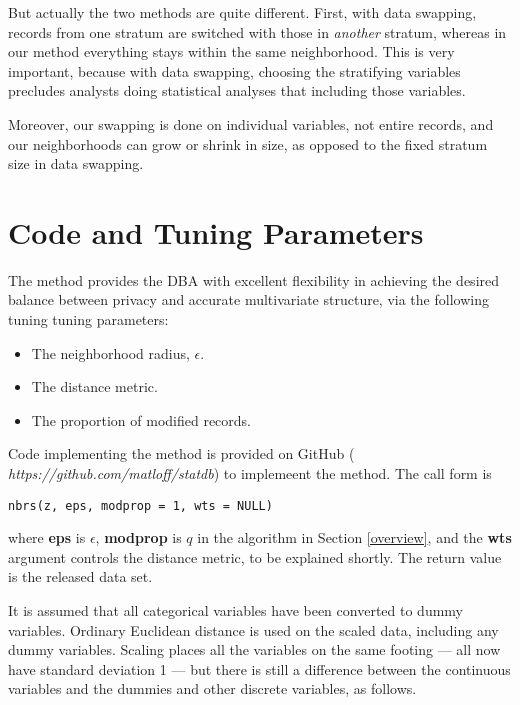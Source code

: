 \documentclass[11pt]{article}
\begin{document}
But actually the two methods are quite different.  First, with data
swapping, records from one stratum are switched with those in {\it
another} stratum, whereas in our method everything stays within the same
neighborhood.  This is very important, because with data swapping,
choosing the stratifying variables precludes analysts doing statistical
analyses that including those variables.

Moreover, our swapping is done on individual variables, not entire
records, and our neighborhoods can grow or shrink in size, as opposed to
the fixed stratum size in data swapping.  

\section{Code and Tuning Parameters}

The method provides the DBA with excellent flexibility in achieving the
desired balance between privacy and accurate multivariate structure, via
the following tuning tuning parameters:

\begin{itemize}

\item The neighborhood radius, $\epsilon$.

\item The distance metric.

\item The proportion of modified records.  

\end{itemize}

Code implementing the method is provided on GitHub ({\it
https://github.com/matloff/statdb}) to implemeent the method.  The call
form is

\begin{lstlisting}
nbrs(z, eps, modprop = 1, wts = NULL) 
\end{lstlisting}

where {\bf eps} is $\epsilon$, {\bf modprop} is $q$ in the algorithm
in Section \ref{overview}, and the {\bf wts} argument controls the
distance metric, to be explained shortly.  The return value is the
released data set.

It is assumed that all categorical variables have been converted to
dummy variables.  Ordinary Euclidean distance is used on the scaled
data, including any dummy variables.  Scaling places all the variables
on the same footing --- all now have standard deviation 1 --- but there
is still a difference between the continuous variables and the dummies
and other discrete variables, as follows.
\end{document}
